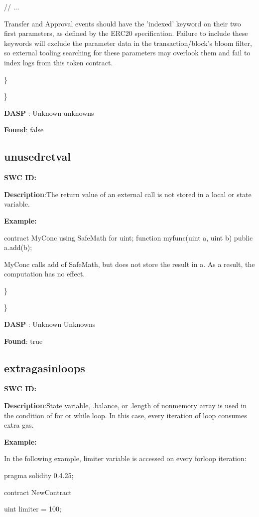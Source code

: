 \documentclass{article}
\begin{document}
{{    // ...
}

Transfer and Approval events should have the 'indexed' keyword on their two first parameters, as defined by the ERC20 specification. Failure to include these keywords will exclude the parameter data in the transaction/block's bloom filter, so external tooling searching for these parameters may overlook them and fail to index logs from this token contract.

\} 

\} 

\textbf{DASP} : Unknown unknowns

\textbf{Found}: false

\subsection{unused\textunderscore retval} 
\textbf{SWC \textunderscore ID:} 

\textbf{Description}:The return value of an external call is not stored in a local or state variable.


\textbf{Example:} 

contract MyConc{
    using SafeMath for uint;
    function my\textunderscore func(uint a, uint b) public{
        a.add(b);
    }
}

MyConc calls add of SafeMath, but does not store the result in a. As a result, the computation has no effect.

\} 

\} 

\textbf{DASP} : Unknown Unknowns

\textbf{Found}: true

\subsection{extra\textunderscore gas\textunderscore in\textunderscore loops} 
\textbf{SWC \textunderscore ID:} 

\textbf{Description}:State variable, .balance, or .length of non\textendash memory array is used in the condition of for or while loop. In this case, every iteration of loop consumes extra gas.


\textbf{Example:} 

In the following example, limiter variable is accessed on every for\textendash loop iteration:

pragma solidity 0.4.25;

contract NewContract {
    uint limiter = 100;

}}
\end{document}
